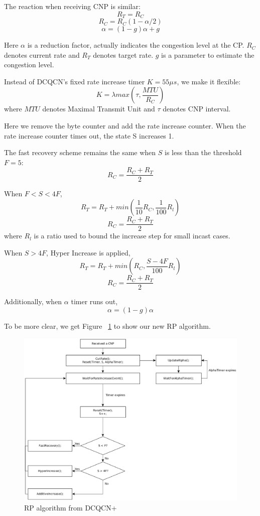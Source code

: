 \documentclass[12pt,a4paper]{article}
\begin{document}
The reaction when receiving CNP is similar:
\[R_T=R_C\]
\[R_C=R_C(1-\alpha /2)\]
\[\alpha = (1-g)\alpha + g\]

Here $\alpha$ is a reduction factor, actually indicates the congestion level at the CP.
$R_C$ denotes current rate and $R_T$ denotes target rate.
$g$ is a parameter to estimate the congestion level.

Instead of DCQCN's fixed rate increase timer $K=55\mu s$, we make it flexible:
\[K=\lambda max(\tau, \frac{MTU}{R_C})\]
where $MTU$ denotes Maximal Transmit Unit and $\tau$ denotes CNP interval.

Here we remove the byte counter and add the rate increase counter.
When the rate increase counter times out, the state S increases 1.

The fast recovery scheme remains the same when $S$ is less than the threshold $F = 5$:
\[R_C=\frac{R_C+R_T}{2}\]

When $F<S<4F$,
\[R_T=R_T+ min(\frac{1}{10}R_C,\frac{1}{100}R_l)\]
\[R_C=\frac{R_C+R_T}{2}\]
where $R_l$ is a ratio used to bound the increase step for small incast cases.

When $S>4F$, Hyper Increase is applied,
\[R_T=R_T+min(R_C, \frac{S-4F}{100}R_l)\]
\[R_C=\frac{R_C+R_T}{2}\]

Additionally, when $\alpha$ timer runs out,
\[\alpha=(1-g)\alpha\]

To be more clear, we get Figure ~\ref{fig:RPalgplus} to show our new RP algorithm.
\begin{figure}[h!]
	\begin{center}
		\includegraphics[width=6in]{RPalgplus}
		\caption{RP algorithm from DCQCN+}
		\label{fig:RPalgplus}
	\end{center}
\end{figure}
\end{document}
